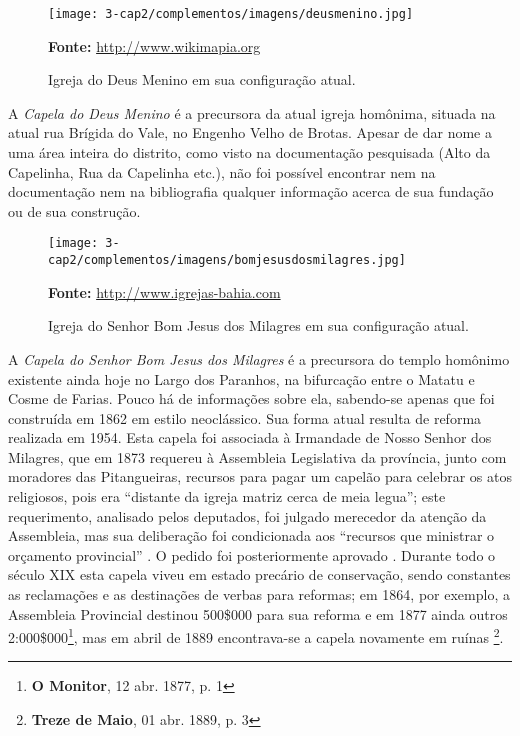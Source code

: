 \begin{figure}[!htp]
\caption{Igreja do Deus Menino em sua configuração atual.}
\centering
\texttt{[image: 3-cap2/complementos/imagens/deusmenino.jpg]}{\footnotesize \par \textbf{Fonte:} \url{http://www.wikimapia.org} \par}
\end{figure}

A \textit{Capela do Deus Menino} é a precursora da atual igreja homônima, situada na atual rua Brígida do Vale, no Engenho Velho de Brotas. Apesar de dar nome a uma área inteira do distrito, como visto na documentação pesquisada (Alto da Capelinha, Rua da Capelinha etc.), não foi possível encontrar nem na documentação nem na bibliografia qualquer informação acerca de sua fundação ou de sua construção.  

\begin{figure}[!htp]
\centering
\caption{Igreja do Senhor Bom Jesus dos Milagres em sua configuração atual.}
\texttt{[image: 3-cap2/complementos/imagens/bomjesusdosmilagres.jpg]}{\footnotesize \par \textbf{Fonte:} \url{http://www.igrejas-bahia.com} \par}
\end{figure}

A \textit{Capela do Senhor Bom Jesus dos Milagres} é a precursora do templo homônimo existente ainda hoje no Largo dos Paranhos, na bifurcação entre o Matatu e Cosme de Farias. Pouco há de informações sobre ela, sabendo-se apenas que foi construída em 1862 \cite[p.~251]{VASCONCELOS2002} em estilo neoclássico. Sua forma atual resulta de reforma realizada em 1954. Esta capela foi associada à Irmandade de Nosso Senhor dos Milagres, que em 1873 requereu à Assembleia Legislativa da província, junto com moradores das Pitangueiras, recursos para pagar um capelão para celebrar os atos religiosos, pois era ``distante da igreja matriz cerca de meia legua''; este requerimento, analisado pelos deputados, foi julgado merecedor da atenção da Assembleia, mas sua deliberação foi condicionada aos ``recursos que ministrar o orçamento provincial'' \cite[p.~46]{bahia_relatassleg_1873}. O pedido foi posteriormente aprovado \cite[p.~53]{bahia_relatassleg_1873}. Durante todo o século XIX esta capela viveu em estado precário de conservação, sendo constantes as reclamações e as destinações de verbas para reformas; em 1864, por exemplo, a Assembleia Provincial destinou 500\$000 para sua reforma\cite[anexo~2, p.~2]{silvagomes_relatorio_1864} e em 1877 ainda outros 2:000\$000\footnote{\textbf{O Monitor}, 12 abr. 1877, p. 1}, mas em abril de 1889 encontrava-se a capela novamente em ruínas \footnote{\textbf{Treze de Maio}, 01 abr. 1889, p. 3}. 

